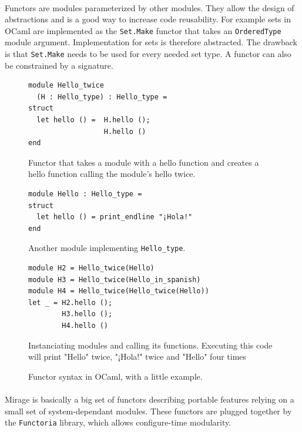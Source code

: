 \documentclass[a4paper]{article}
\begin{document}
\paragraph{}
Functors are modules parameterized by other modules. They allow the design of abstractions and is a good way to increase 
code reusability. For example sets in OCaml are implemented as the \texttt{Set.Make} functor that takes an \texttt{OrderedType} 
module argument. Implementation for sets is therefore abstracted. The drawback is that \texttt{Set.Make} needs to be used for 
every needed set type. A functor can also be constrained by a signature.
\begin{figure}[!h]
 \begin{minipage}{0.5\textwidth}
  \centering
  \begin{verbatim}
module Hello_twice 
  (H : Hello_type) : Hello_type =
struct
  let hello () =  H.hello (); 
                  H.hello ()
end
  \end{verbatim}
  \caption*{Functor that takes a module with a hello function and creates a hello function calling  the module's hello twice.}
 \end{minipage}
 \hspace{0.05\textwidth}
 \begin{minipage}{0.45\textwidth}
  \centering
  \begin{verbatim}
module Hello : Hello_type =
struct
  let hello () = print_endline "¡Hola!"
end
  \end{verbatim}
  \caption*{Another module implementing \texttt{Hello\_type}.}
 \end{minipage}
 \begin{center}
  \begin{verbatim}
module H2 = Hello_twice(Hello)
module H3 = Hello_twice(Hello_in_spanish)
module H4 = Hello_twice(Hello_twice(Hello))
let _ = H2.hello (); 
        H3.hello (); 
        H4.hello ()
  \end{verbatim}
 \caption*{Instanciating modules and calling its functions. Executing this code will print "Hello" twice, "¡Hola!" twice and "Hello" four times}
 \end{center}
 \caption{Functor syntax in OCaml, with a little example. }
\end{figure}

\paragraph{}
Mirage is basically a big set of functors describing portable features relying on a small set of system-dependant modules. 
These functors are plugged together by the \texttt{Functoria} library, which allows configure-time modularity.
\end{document}
